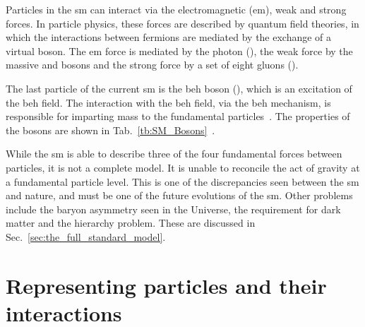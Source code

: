 Particles in the \acrshort{sm} can interact via the electromagnetic (\acrshort{em}), weak and strong forces. 
In particle physics, these forces are described by quantum field theories, in which the interactions between fermions are mediated by the exchange of a virtual boson.
The \acrshort{em} force is mediated by the photon (\photon{}), the weak force by the massive \Wboson{} and \Zboson{} bosons and the strong force by a set of eight gluons (\gluon{}). 

The last particle of the current \acrshort{sm} is the \acrfull{beh} boson (\Hboson{}), which is an excitation of the \acrshort{beh} field.
The interaction with the \acrshort{beh} field, via the \acrshort{beh} mechanism, is responsible for imparting mass to the fundamental particles~\cite{Th:Higgs1, Th:Higgs2, Th:Higgs3}. 
The properties of the bosons are shown in Tab.~\ref{tb:SM_Bosons}~\cite{PDG}.


While the \acrshort{sm} is able to describe three of the four fundamental forces between particles, it is not a complete model.
It is unable to reconcile the act of gravity at a fundamental particle level.
This is one of the discrepancies seen between the \acrshort{sm} and nature, and must be one of the future evolutions of the \acrshort{sm}.
Other problems include the baryon asymmetry seen in the Universe, the requirement for dark matter and the hierarchy problem.
These are discussed in Sec.~\ref{sec:the_full_standard_model}.

\section{Representing particles and their interactions}
\label{sec:FD}


